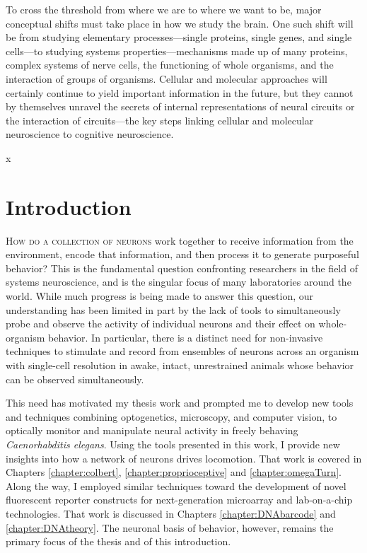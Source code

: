 \begin{savequote}[75mm] 
To cross the threshold from where we are to where we want to be, major conceptual shifts must take place in how we study the brain. One such shift will be from studying elementary processes---single proteins, single genes, and single cells---to studying systems properties---mechanisms made up of many proteins, complex systems of nerve cells, the functioning of whole organisms, and the interaction of groups of organisms. Cellular and molecular approaches will certainly continue to yield important information in the future, but they cannot by themselves unravel the secrets of internal representations of neural circuits or the interaction of circuits---the key steps linking cellular and molecular neuroscience to cognitive neuroscience. 
\end{savequote}
x


\chapter{Introduction}\label{chapter:intro}

\lettrine{H}{ow do a collection of neurons} work together to receive information from the environment, encode that information, and then process it to generate  purposeful behavior?  This is the fundamental question  confronting researchers in the field of systems neuroscience, and is the singular focus of many laboratories around the world. While much progress is being made to answer this question, our understanding has been limited in part by the lack of tools to simultaneously probe and observe the activity of individual neurons and their effect on whole-organism behavior. In particular, there is a distinct need for non-invasive techniques to stimulate and record from ensembles of neurons across an organism with single-cell resolution in awake, intact, unrestrained animals whose behavior can be observed simultaneously.

This need has motivated my thesis work and prompted me to develop new tools and techniques combining optogenetics, microscopy, and computer vision, to optically monitor and manipulate neural activity in freely behaving \emph{Caenorhabditis elegans}. Using the tools presented in this work, I provide new insights into how a network of neurons drives locomotion. That work is covered in Chapters \ref{chapter:colbert}, \ref{chapter:proprioceptive} and  \ref{chapter:omegaTurn}. Along the way, I employed similar techniques  toward the development of  novel fluorescent reporter constructs for next-generation microarray and lab-on-a-chip technologies. That work is discussed in Chapters \ref{chapter:DNAbarcode} and \ref{chapter:DNAtheory}. The neuronal basis of behavior, however, remains the primary focus of the thesis and of this introduction.


